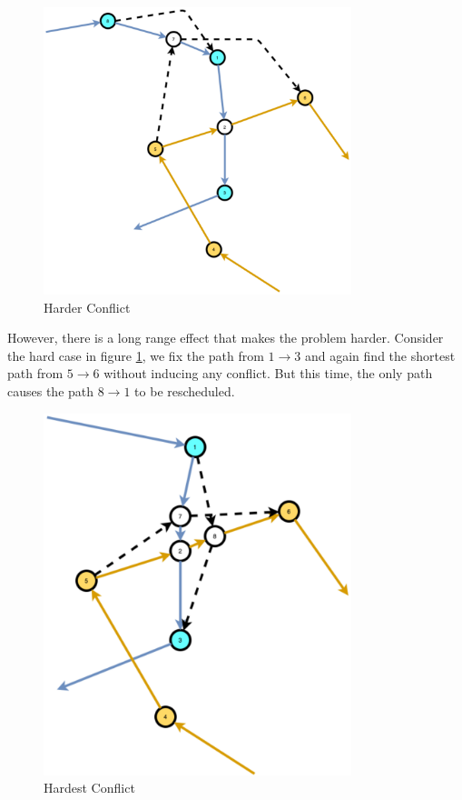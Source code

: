 \begin{figure}[h!]
\centering
\includegraphics[width=0.8\textwidth]{assets/harder_conflict.png}
\caption{Harder Conflict}
\label{fig:harder_conflict}
\end{figure}

However, there is a long range effect that makes the problem harder. Consider the hard case in figure \ref{fig:harder_conflict}, we fix the path from $1 \to 3$ and again find the shortest path from $5 \to 6$ without inducing any conflict. But this time, the only path causes the path $8 \to 1$ to be rescheduled.

\begin{figure}[h!]
\centering
\includegraphics[width=0.8\textwidth]{assets/hardest_conflict.png}
\caption{Hardest Conflict}
\label{fig:hardest_conflict}
\end{figure}

